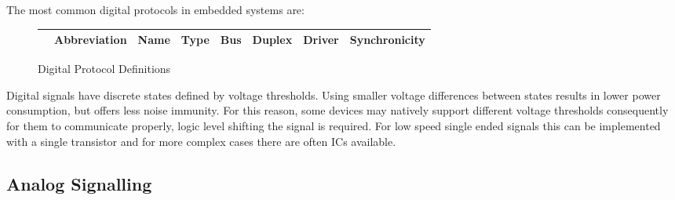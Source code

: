 \documentclass[main.tex]{subfiles}
\begin{document}
The most common digital protocols in embedded systems are:
\begin{figure}[h!]
    \centering
    \begin{tabular}{|c|c|c|c|c|c|c|c|}
        \hline & Abbreviation & Name & Type & Bus & Duplex & Driver & Synchronicity \\ \hline
        

    \end{tabular}
    \caption{Digital Protocol Definitions}
    \label{fig:digital_protocols}
\end{figure}

Digital signals have discrete states defined by voltage thresholds. Using smaller voltage differences between states results in lower power consumption, but offers less noise immunity. For this reason, some devices may natively support different voltage thresholds consequently for them to communicate properly, logic level shifting the signal is required. For low speed single ended signals this can be implemented with a single transistor and for more complex cases there are often ICs available. 


\subsection{Analog Signalling}
\end{document}
